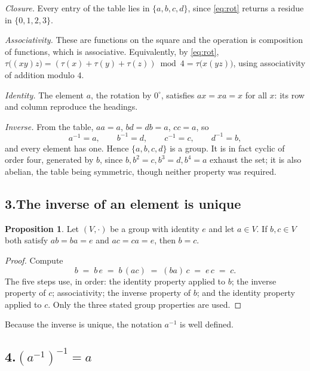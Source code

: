 \documentclass[11pt]{article}
\theoremstyle{definition}\newtheorem*{definition}{Definition}
\newtheorem{proposition}{Proposition}
\theoremstyle{definition}
\begin{document}
\emph{Closure.} Every entry of the table lies in $\{a,b,c,d\}$, since
\eqref{eq:rot} returns a residue in $\{0,1,2,3\}$.

\emph{Associativity.} These are functions on the square and the operation
is composition of functions, which is associative. Equivalently, by
\eqref{eq:rot},
$\tau\big((xy)z\big) = (\tau(x)+\tau(y)+\tau(z)) \bmod 4
= \tau\big(x(yz)\big)$, using associativity of addition modulo $4$.

\emph{Identity.} The element $a$, the rotation by $0^{\circ}$, satisfies
$ax = xa = x$ for all $x$: its row and column reproduce the headings.

\emph{Inverse.} From the table, $aa = a$, $bd = db = a$, $cc = a$, so
\[
  a^{-1} = a, \qquad b^{-1} = d, \qquad c^{-1} = c, \qquad d^{-1} = b,
\]
and every element has one. Hence $\{a,b,c,d\}$ is a group. It is in fact
cyclic of order four, generated by $b$, since
$b, b^2 = c, b^3 = d, b^4 = a$ exhaust the set; it is also abelian,
the table being symmetric, though neither property was required.

\subsection*{3.\quad The inverse of an element is unique}

\begin{proposition}
Let $(V,\cdot)$ be a group with identity $e$ and let $a \in V$. If
$b, c \in V$ both satisfy $ab = ba = e$ and $ac = ca = e$, then $b = c$.
\end{proposition}

\begin{proof}
Compute
\[
  b \;=\; b\,e \;=\; b\,(ac) \;=\; (ba)\,c \;=\; e\,c \;=\; c .
\]
The five steps use, in order: the identity property applied to $b$; the
inverse property of $c$; associativity; the inverse property of $b$; and
the identity property applied to $c$. Only the three stated group
properties are used.
\end{proof}

Because the inverse is unique, the notation $a^{-1}$ is well defined.

\subsection*{4.\quad $(a^{-1})^{-1} = a$}
\end{document}
